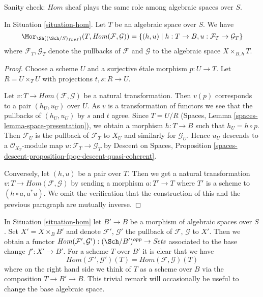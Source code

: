 \noindent
Sanity check: $\mathit{Hom}$ sheaf plays the same role among algebraic spaces
over $S$.

\begin{lemma}
\label{lemma-extend-hom-to-spaces}
In Situation \ref{situation-hom}. Let $T$ be an algebraic space over $S$.
We have
$$
\Mor_{\Sh((\Sch/S)_{fppf})}(T, \mathit{Hom}(\mathcal{F}, \mathcal{G})) =
\{(h, u) \mid h : T \to B, u : \mathcal{F}_T \to \mathcal{G}_T\}
$$
where $\mathcal{F}_T, \mathcal{G}_T$ denote the pullbacks of $\mathcal{F}$
and $\mathcal{G}$ to the algebraic space $X \times_{B, h} T$.
\end{lemma}

\begin{proof}
Choose a scheme $U$ and a surjective \'etale morphism $p : U \to T$.
Let $R = U \times_T U$ with projections $t, s : R \to U$.

\medskip\noindent
Let $v : T \to \mathit{Hom}(\mathcal{F}, \mathcal{G})$
be a natural transformation. Then $v(p)$ corresponds to a pair
$(h_U, u_U)$ over $U$. As $v$ is a transformation of functors we see
that the pullbacks of $(h_U, u_U)$ by $s$ and $t$ agree.
Since $T = U/R$ (Spaces, Lemma \ref{spaces-lemma-space-presentation}),
we obtain a morphism $h : T \to B$ such that
$h_U = h \circ p$. Then $\mathcal{F}_U$ is the pullback of
$\mathcal{F}_T$ to $X_U$ and similarly for $\mathcal{G}_U$.
Hence $u_U$ descends to a $\mathcal{O}_{X_T}$-module map
$u : \mathcal{F}_T \to \mathcal{G}_T$ by
Descent on Spaces, Proposition
\ref{spaces-descent-proposition-fpqc-descent-quasi-coherent}.

\medskip\noindent
Conversely, let $(h, u)$ be a pair over $T$. Then we get a natural
transformation $v : T \to \mathit{Hom}(\mathcal{F}, \mathcal{G})$
by sending a morphism $a : T' \to T$ where $T'$ is a scheme
to $(h \circ a, a^*u)$. We omit the verification that the construction
of this and the previous paragraph are mutually inverse.
\end{proof}

\begin{remark}
\label{remark-hom-base-change}
In Situation \ref{situation-hom} let $B' \to B$ be a morphism of
algebraic spaces over $S$. Set $X' = X \times_B B'$ and denote
$\mathcal{F}'$, $\mathcal{G}'$ the pullback of
$\mathcal{F}$, $\mathcal{G}$ to $X'$. Then we obtain a functor
$\mathit{Hom}(\mathcal{F}', \mathcal{G}') : (\Sch/B')^{opp} \to \textit{Sets}$
associated to the base change $f' : X' \to B'$. For a scheme $T$ over $B'$
it is clear that we have
$$
\mathit{Hom}(\mathcal{F}', \mathcal{G}')(T) =
\mathit{Hom}(\mathcal{F}, \mathcal{G})(T)
$$
where on the right hand side we think of $T$ as a scheme over $B$
via the composition $T \to B' \to B$. This trivial remark
will occasionally be useful to change the base algebraic space.
\end{remark}

